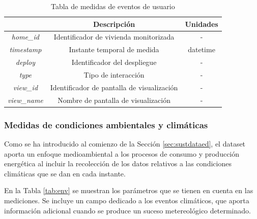 \vspace{3mm}

\begin{table}[h!]
    \centering
    \begin{tabular}{|c|c|c|}
    \hline
    \rowcolor[HTML]{AAAAAA} 
    \multicolumn{1}{|c|}{\cellcolor[HTML]{AAAAAA}Campo} & \multicolumn{1}{c|}{\cellcolor[HTML]{AAAAAA}Descripción} & Unidades \\ \hline
    \textit{home\_id} & Identificador de vivienda monitorizada & - \\ \hline
    \textit{timestamp} & Instante temporal de medida & datetime \\ \hline
    \textit{deploy} & Identificador del despliegue & - \\ \hline
    \textit{type} & Tipo de interacción & - \\ \hline
    \textit{view\_id} & Identificador de pantalla de visualización & - \\ \hline
    \textit{view\_name} & Nombre de pantalla de visualización & - \\ \hline
    \end{tabular}
    \caption{Tabla de medidas de eventos de usuario \cite{sustdata}}
    \label{tab:users}
\end{table}

\subsubsection{Medidas de condiciones ambientales y climáticas}

Como se ha introducido al comienzo de la Sección \ref{sec:sustdataed}, el dataset aporta un enfoque medioambiental a los procesos de consumo y producción energética al incluir la recolección de los datos relativos a las condiciones climáticas que se dan en cada instante.

\vspace{3mm}

En la Tabla \ref{tab:env} se muestran los parámetros que se tienen en cuenta en las mediciones. Se incluye un campo dedicado a los eventos climáticos, que aporta información adicional cuando se produce un suceso metereológico determinado.

\vspace{3mm}

